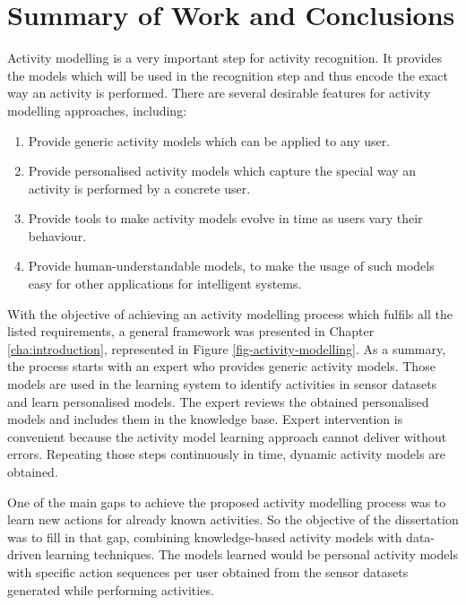 \section{Summary of Work and Conclusions}
\label{sec:conclusions:conclusions}

Activity modelling is a very important step for activity recognition. It provides the models which will be used in the recognition step and thus encode the exact way an activity is performed. There are several desirable features for activity modelling approaches, including:

\begin{enumerate}
 \item Provide generic activity models which can be applied to any user.
 \item Provide personalised activity models which capture the special way an activity is performed by a concrete user.
 \item Provide tools to make activity models evolve in time as users vary their behaviour.
 \item Provide human-understandable models, to make the usage of such models easy for other applications for intelligent systems.
\end{enumerate}

With the objective of achieving an activity modelling process which fulfils all the listed requirements, a general framework was presented in Chapter \ref{cha:introduction}, represented in Figure \ref{fig-activity-modelling}. As a summary, the process starts with an expert who provides generic activity models. Those models are used in the learning system to identify activities in sensor datasets and learn personalised models. The expert reviews the obtained personalised models and includes them in the knowledge base. Expert intervention is convenient because the activity model learning approach cannot deliver without errors. Repeating those steps continuously in time, dynamic activity models are obtained.

One of the main gaps to achieve the proposed activity modelling process was to learn new actions for already known activities. So the objective of the dissertation was to fill in that gap, combining knowledge-based activity models with data-driven learning techniques. The models learned would be personal activity models with specific action sequences per user obtained from the sensor datasets generated while performing activities.

